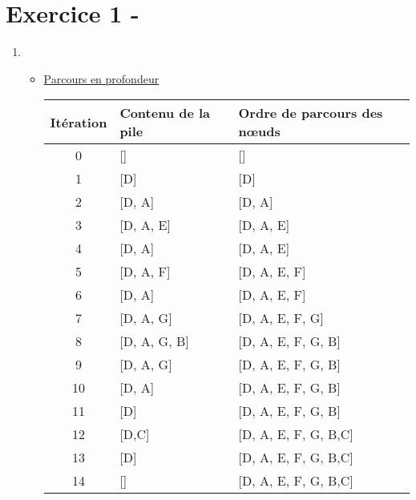 \documentclass[a4paper, 12pt]{report}
\begin{document}

\section{Exercice 1 -}

\begin{enumerate}

\item 
\begin{itemize}[label=$\bullet$]

\item \underline{Parcours en profondeur}
\begin{center}
\begin{tabular}{|c|l|l|}
\hline
Itération & Contenu de la pile & Ordre de parcours des n{\oe}uds\\
\hline
0 & [] & []\\
\hline
1 & [D] & [D] \\
\hline
2 & [D, A] & [D, A]\\
\hline
3 & [D, A, E] & [D, A, E]\\
\hline
4 & [D, A] & [D, A, E]\\
\hline
5 & [D, A, F] & [D, A, E, F]\\
\hline
6 & [D, A] & [D, A, E, F]\\
\hline
7 & [D, A, G] & [D, A, E, F, G]\\
\hline
8 & [D, A, G, B] & [D, A, E, F, G, B]\\
\hline
9 & [D, A, G] & [D, A, E, F, G, B]\\
\hline
10 & [D, A] & [D, A, E, F, G, B]\\
\hline
11 & [D] & [D, A, E, F, G, B]\\
\hline
12 & [D,C] & [D, A, E, F, G, B,C]\\
\hline
13 & [D] & [D, A, E, F, G, B,C]\\
\hline
14 & [] & [D, A, E, F, G, B,C]\\
\hline
\end{tabular}
\end{center}


\end{itemize}
\end{enumerate}
\end{document}
